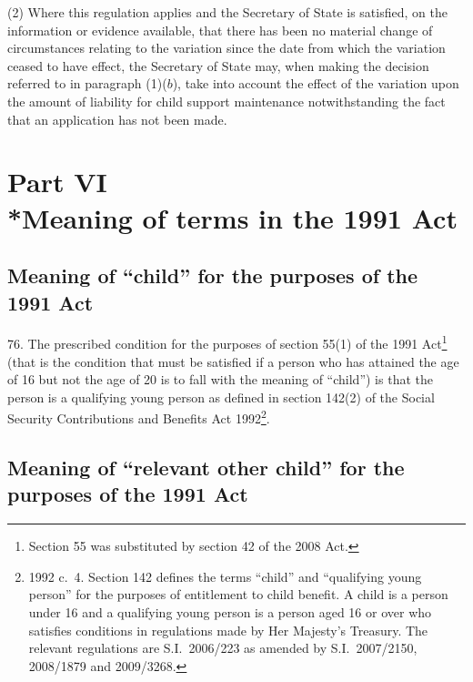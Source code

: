 \documentclass[12pt,a4paper]{article}
\begin{document}
(2) Where this regulation applies 
and the Secretary of State is satisfied, on the information or evidence available, that there has been no material change of circumstances relating to the variation since the date from which the variation ceased to have effect,  %
the Secretary of State may, when making the decision referred to in paragraph (1)($b$), take into account the effect of the variation upon the amount of liability for child support maintenance notwithstanding the fact that an application has not been made.


\section[Part VI --- Meaning of terms in the 1991 Act]{Part VI\\*Meaning of terms in the 1991 Act}

\subsection[76. Meaning of “child” for the purposes of the 1991 Act]{Meaning of “child” for the purposes of the 1991 Act}

76.  The prescribed condition for the purposes of section 55(1) of the 1991 Act\footnote{Section 55 was substituted by section 42 of the 2008 Act.} (that is the condition that must be satisfied if a person who has attained the age of 16 but not the age of 20 is to fall with the meaning of “child”) is that the person is a qualifying young person as defined in section 142(2) of the Social Security Contributions and Benefits Act 1992\footnote{1992 c.~4. Section 142 defines the terms “child” and “qualifying young person” for the purposes of entitlement to child benefit. A child is a person under 16 and a qualifying young person is a person aged 16 or over who satisfies conditions in regulations made by Her Majesty’s Treasury. The relevant regulations are S.I.~2006/223 as amended by S.I.~2007/2150, 2008/1879 and 2009/3268.}.

\subsection[77. 
Meaning of “relevant other child” for the purposes of the 1991 Act%
]{%
Meaning of “relevant other child” for the purposes of the 1991 Act%
}
\end{document}
